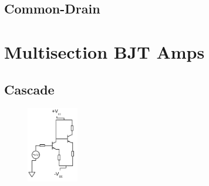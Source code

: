 \documentclass{report}
\newcommand{\imwidth}{0.2\textwidth}
\begin{document}
\section{Common-Drain}

\chapter{Multisection BJT Amps}
\section{Cascade}
\begin{figure}
\centering
\includegraphics[width = \imwidth]{cascade}
\caption{}
\end{figure}
\end{document}

